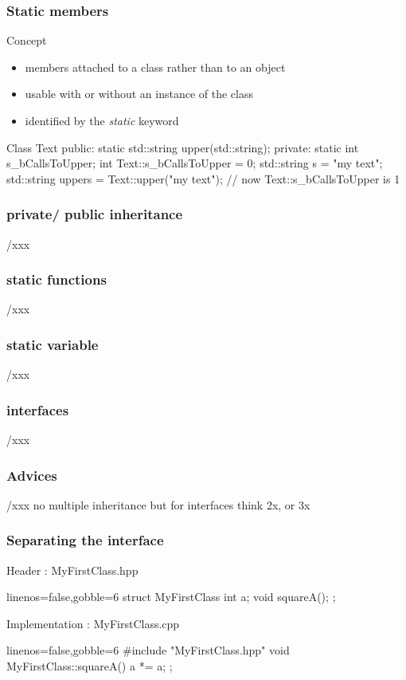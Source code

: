 \begin{frame}[fragile,label=current]
\xxx
  \frametitle{Static members}
  \begin{block}{Concept}
    \begin{itemize}
    \item members attached to a class rather than to an object
    \item usable with or without an instance of the class
    \item identified by the {\it static} keyword
    \end{itemize}
  \end{block}
  \begin{cppcode*}{}
    Class Text {
    public:
      static std::string upper(std::string);
    private:
      static int s_bCallsToUpper;
    }
    int Text::s_bCallsToUpper = 0;
    std::string s = "my text";
    std::string uppers = Text::upper("my text");
    // now Text::s_bCallsToUpper is 1
  \end{cppcode*}
\end{frame}

\begin{frame}[fragile,label=current]
  \frametitle{private/ public inheritance}
  /xxx
\end{frame}

\begin{frame}[fragile,label=current]
  \frametitle{static functions}
  /xxx
\end{frame}

\begin{frame}[fragile,label=current]
  \frametitle{static variable}
  /xxx
\end{frame}

\begin{frame}[fragile,label=current]
  \frametitle{interfaces}
  /xxx
\end{frame}

\begin{frame}[fragile,label=current]
  \frametitle{Advices}
  /xxx
  no multiple inheritance but for interfaces
  think 2x, or 3x
\end{frame}

\begin{frame}[fragile]
  \frametitle{Separating the interface}
  \begin{block}{Header : MyFirstClass.hpp}
    \begin{cppcode*}{linenos=false,gobble=6}
      struct MyFirstClass {
        int a;
        void squareA();
      };
    \end{cppcode*}
  \end{block}
  \begin{block}{Implementation : MyFirstClass.cpp}
    \begin{cppcode*}{linenos=false,gobble=6}
      #include "MyFirstClass.hpp"
      void MyFirstClass::squareA() {
        a *= a;
      };
    \end{cppcode*}
  \end{block}
\end{frame}

